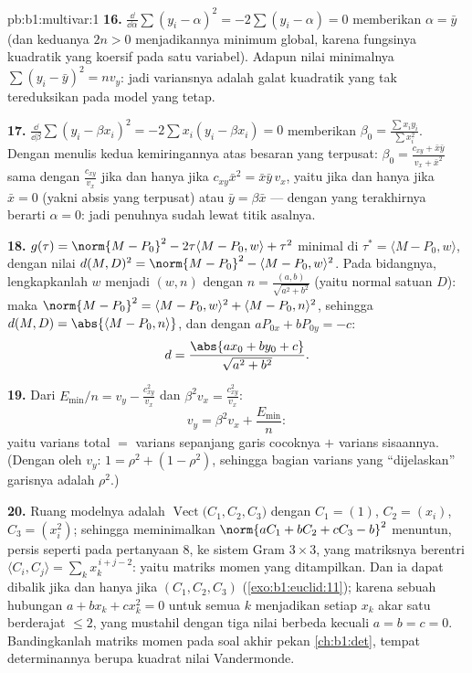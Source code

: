 \begin{solution}{pb:b1:multivar:1}
\textbf{16.} $\frac{\dd}{\dd\alpha}\sum(y_i - \alpha)^2 =
-2\sum(y_i - \alpha) = 0$ memberikan $\alpha = \bar y$ (dan
 keduanya $2n > 0$ menjadikannya minimum global, karena
fungsinya kuadratik yang koersif pada satu variabel). Adapun nilai
minimalnya $\sum(y_i - \bar y)^2 = n v_y$: jadi variansnya adalah
galat kuadratik yang tak tereduksikan pada model yang tetap.

\textbf{17.} $\frac{\dd}{\dd\beta}\sum(y_i - \beta x_i)^2 =
-2\sum x_i(y_i - \beta x_i) = 0$ memberikan $\beta_0 = \frac{\sum
x_iy_i}{\sum x_i^2}$. Dengan menulis kedua kemiringannya atas besaran
yang terpusat: $\beta_0 = \frac{c_{xy} + \bar x\bar y}{v_x + \bar
x^2}$ sama dengan $\frac{c_{xy}}{v_x}$ jika dan hanya jika $c_{xy}\bar x^2 = \bar
x\bar y\,v_x$, yaitu jika dan hanya jika $\bar x = 0$ (yakni absis yang terpusat) atau
$\bar y = \beta\bar x$ --- dengan yang terakhirnya berarti $\alpha = 0$: jadi
 penuhnya sudah lewat titik asalnya.

\textbf{18.} $g(\tau) = \norm{M - P_0}^2 - 2\tau\langle M - P_0,
w\rangle + \tau^2$ minimal di $\tau^* = \langle M - P_0,
w\rangle$, dengan nilai $d(M,D)^2 = \norm{M - P_0}^2 - \langle M -
P_0, w\rangle^2$. Pada bidangnya, lengkapkanlah $w$ menjadi 
 $(w, n)$ dengan $n = \frac{(a, b)}{\sqrt{a^2+b^2}}$ (yaitu normal
satuan $D$): maka $\norm{M - P_0}^2 = \langle M - P_0,
w\rangle^2 + \langle M - P_0, n\rangle^2$, sehingga $d(M, D) =
\abs{\langle M - P_0, n\rangle}$, dan dengan $aP_{0x} + bP_{0y} =
-c$:
\[
d = \frac{\abs{a x_0 + b y_0 + c}}{\sqrt{a^2 + b^2}} .
\]

\textbf{19.} Dari $E_{\min}/n = v_y - \frac{c_{xy}^2}{v_x}$ dan
$\beta^2 v_x = \frac{c_{xy}^2}{v_x}$:
\[
v_y = \beta^2 v_x + \frac{E_{\min}}n :
\]
yaitu varians total $=$ varians sepanjang garis cocoknya $+$ varians
sisaannya. (Dengan  oleh $v_y$: $1 = \rho^2 + (1 - \rho^2)$, sehingga
bagian varians yang ``dijelaskan'' garisnya adalah $\rho^2$.)

\textbf{20.} Ruang modelnya adalah
$\operatorname{Vect}\bigl(C_1, C_2, C_3\bigr)$ dengan $C_1 = (1)$,
$C_2 = (x_i)$, $C_3 = (x_i^2)$; sehingga meminimalkan $\norm{aC_1 + bC_2 +
cC_3 - b}^2$ menuntun, persis seperti pada pertanyaan 8, ke sistem
Gram $3\times3$, yang matriksnya berentri $\langle C_i, C_j\rangle =
\sum_k x_k^{\,i+j-2}$: yaitu matriks momen yang ditampilkan. Dan ia
dapat dibalik jika dan hanya jika $(C_1, C_2, C_3)$ 
(\cref{exo:b1:euclid:11}); karena sebuah hubungan $a + bx_k + cx_k^2 = 0$
untuk semua $k$ menjadikan setiap $x_k$ akar satu 
berderajat $\leq 2$, yang mustahil dengan tiga nilai berbeda kecuali $a
= b = c = 0$. Bandingkanlah matriks momen pada soal akhir pekan
\cref{ch:b1:det}, tempat determinannya berupa kuadrat nilai
Vandermonde.


\end{solution}
